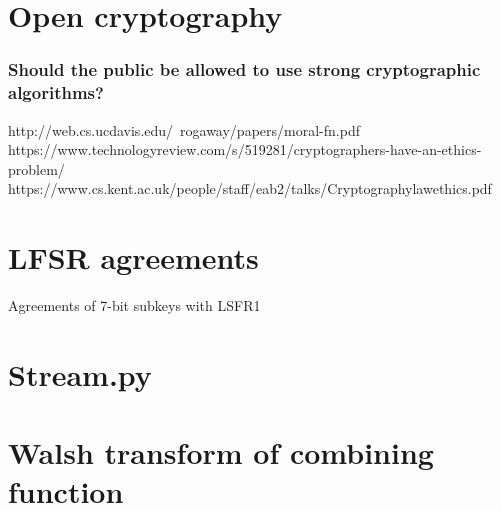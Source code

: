 \documentclass[british,11pt,a4paper]{article}
\begin{document}
\clearpage
\section{Open cryptography}
\subsubsection{Should the public be allowed to use strong cryptographic algorithms?}
http://web.cs.ucdavis.edu/~rogaway/papers/moral-fn.pdf
https://www.technologyreview.com/s/519281/cryptographers-have-an-ethics-problem/
https://www.cs.kent.ac.uk/people/staff/eab2/talks/Cryptographylawethics.pdf

\clearpage
\begin{appendices}
	\section{LFSR agreements}\label{app:lfsragreements}
	Agreements of 7-bit subkeys with LSFR1
	\\

	\section{Stream.py}\label{app:stream}
	
  \clearpage

	\section{Walsh transform of combining function}\label{app:walsh}
  \clearpage


\end{appendices}
\end{document}
